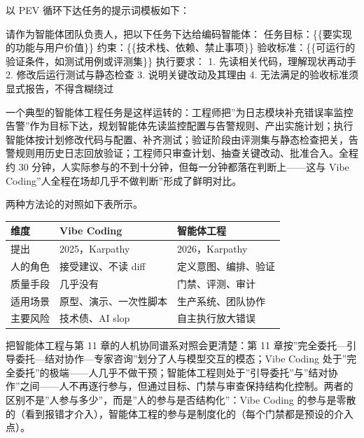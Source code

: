 \documentclass[12pt,a4paper,twoside,openany]{ctexbook}
\numberwithin{figure}{chapter}
\numberwithin{table}{chapter}
\newenvironment{Shaded}{}{}
\newcommand{\NormalTok}[1]{#1}
\newcounter{none}
\begin{document}
以 PEV 循环下达任务的提示词模板如下：

\begin{Shaded}
\begin{Highlighting}[]
\NormalTok{请作为智能体团队负责人，把以下任务下达给编码智能体：}
\NormalTok{任务目标：\{\{要实现的功能与用户价值\}\}}
\NormalTok{约束：\{\{技术栈、依赖、禁止事项\}\}}
\NormalTok{验收标准：\{\{可运行的验证条件，如测试用例或评测集\}\}}
\NormalTok{执行要求：}
\NormalTok{1. 先读相关代码，理解现状再动手}
\NormalTok{2. 修改后运行测试与静态检查}
\NormalTok{3. 说明关键改动及其理由}
\NormalTok{4. 无法满足的验收标准须显式报告，不得含糊绕过}
\end{Highlighting}
\end{Shaded}

一个典型的智能体工程任务是这样运转的：工程师把''为日志模块补充错误率监控告警''作为目标下达，规划智能体先读监控配置与告警规则、产出实施计划；执行智能体按计划修改代码与配置、补齐测试；验证阶段由评测集与静态检查把关，告警规则用历史日志回放验证；工程师只审查计划、抽查关键改动、批准合入。全程约
30 分钟，人实际参与的不到十分钟，但每一分钟都落在判断上------这与 Vibe
Coding''人全程在场却几乎不做判断''形成了鲜明对比。

两种方法论的对照如下表所示。

{\def\LTcaptype{none} %
\begin{longtable}[]{@{}lll@{}}
\toprule\noalign{}
维度 & Vibe Coding & 智能体工程 \\
\midrule\noalign{}
\endhead
\bottomrule\noalign{}
\endlastfoot
提出 & 2025，Karpathy & 2026，Karpathy \\
人的角色 & 接受建议、不读 diff & 定义意图、编排、验证 \\
质量手段 & 几乎没有 & 门禁、评测、审计 \\
适用场景 & 原型、演示、一次性脚本 & 生产系统、团队协作 \\
主要风险 & 技术债、AI slop & 自主执行放大错误 \\
\end{longtable}
}

把智能体工程与第 11 章的人机协同谱系对照会更清楚：第 11
章按''完全委托---引导委托---结对协作---专家咨询''划分了人与模型交互的模态；Vibe
Coding
处于''完全委托''的极端------人几乎不做干预；智能体工程则处于''引导委托''与''结对协作''之间------人不再逐行参与，但通过目标、门禁与审查保持结构化控制。两者的区别不是''人参与多少''，而是''人的参与是否结构化''：Vibe
Coding
的参与是零散的（看到报错才介入），智能体工程的参与是制度化的（每个门禁都是预设的介入点）。
\end{document}
